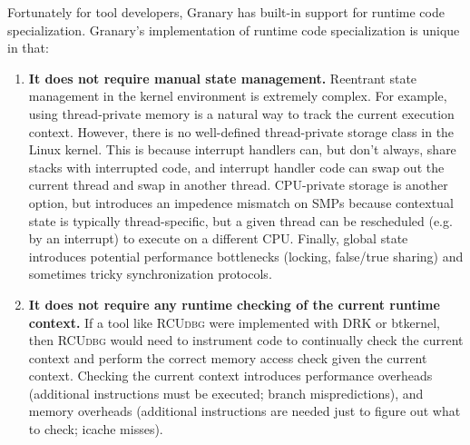\documentclass[preprint]{sigplanconf}
\newcommand{\toolname}[1]{{\scshape #1}}
\begin{document}

Fortunately for tool developers, Granary has built-in support for runtime code specialization. Granary's implementation of runtime code specialization is unique in that: \begin{enumerate}

	\item {\bf It does not require manual state management.} Reentrant state management in the kernel environment is extremely complex. For example, using thread-private memory is a natural way to track the current execution context. However, there is no well-defined thread-private storage class in the Linux kernel. This is because interrupt handlers can, but don't always, share stacks with interrupted code, and interrupt handler code can swap out the current thread and swap in another thread. CPU-private storage is another option, but introduces an impedence mismatch on SMPs because contextual state is typically thread-specific, but a given thread can be rescheduled (e.g. by an interrupt) to execute on a different CPU. Finally, global state introduces potential performance bottlenecks (locking, false/true sharing) and sometimes tricky synchronization protocols.

	\item {\bf It does not require any runtime checking of the current runtime context.} If a tool like \toolname{RCUdbg} were implemented with DRK or btkernel, then \toolname{RCUdbg} would need to instrument code to continually check the current context and perform the correct memory access check given the current context. Checking the current context introduces performance overheads (additional instructions must be executed; branch mispredictions), and memory overheads (additional instructions are needed just to figure out what to check; icache misses).

\end{enumerate}
\end{document}
